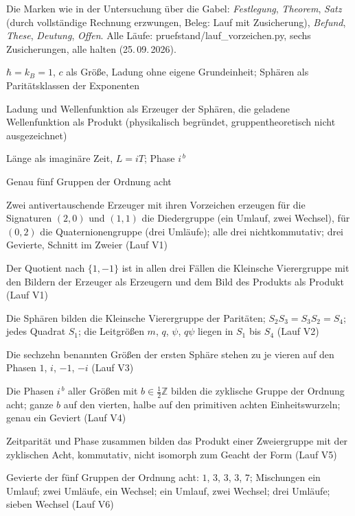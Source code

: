 \documentclass[11pt,a4paper]{article}
\begin{document}
Die Marken wie in der Untersuchung über die Gabel: \emph{Festlegung}, \emph{Theorem}, \emph{Satz} (durch vollständige Rechnung erzwungen, Beleg: Lauf mit Zusicherung), \emph{Befund}, \emph{These}, \emph{Deutung}, \emph{Offen}. Alle Läufe: pruefstand/lauf\_vorzeichen.py, sechs Zusicherungen, alle halten (25.\,09.\,2026).

\begin{description}[itemsep=1pt,font=\normalfont\bfseries]
\item[Festlegung:] $\hbar=k_B=1$, $c$ als Größe, Ladung ohne eigene Grundeinheit; Sphären als Paritätsklassen der Exponenten
\item[Festlegung:] Ladung und Wellenfunktion als Erzeuger der Sphären, die geladene Wellenfunktion als Produkt (physikalisch begründet, gruppentheoretisch nicht ausgezeichnet)
\item[Festlegung:] Länge als imaginäre Zeit, $L=iT$; Phase $i^{\,b}$
\item[Theorem:] Genau fünf Gruppen der Ordnung acht
\item[Satz:] Zwei antivertauschende Erzeuger mit ihren Vorzeichen erzeugen für die Signaturen $(2,0)$ und $(1,1)$ die Diedergruppe (ein Umlauf, zwei Wechsel), für $(0,2)$ die Quaternionengruppe (drei Umläufe); alle drei nichtkommutativ; drei Gevierte, Schnitt im Zweier (Lauf V1)
\item[Satz:] Der Quotient nach $\{1,-1\}$ ist in allen drei Fällen die Kleinsche Vierergruppe mit den Bildern der Erzeuger als Erzeugern und dem Bild des Produkts als Produkt (Lauf V1)
\item[Satz:] Die Sphären bilden die Kleinsche Vierergruppe der Paritäten; $S_2S_3=S_3S_2=S_4$; jedes Quadrat $S_1$; die Leitgrößen $m$, $q$, $\psi$, $q\psi$ liegen in $S_1$ bis $S_4$ (Lauf V2)
\item[Satz:] Die sechzehn benannten Größen der ersten Sphäre stehen zu je vieren auf den Phasen $1$, $i$, $-1$, $-i$ (Lauf V3)
\item[Satz:] Die Phasen $i^{\,b}$ aller Größen mit $b\in\tfrac12\mathbb Z$ bilden die zyklische Gruppe der Ordnung acht; ganze $b$ auf den vierten, halbe auf den primitiven achten Einheitswurzeln; genau ein Geviert (Lauf V4)
\item[Satz:] Zeitparität und Phase zusammen bilden das Produkt einer Zweiergruppe mit der zyklischen Acht, kommutativ, nicht isomorph zum Geacht der Form (Lauf V5)
\item[Satz:] Gevierte der fünf Gruppen der Ordnung acht: $1$, $3$, $3$, $3$, $7$; Mischungen ein Umlauf; zwei Umläufe, ein Wechsel; ein Umlauf, zwei Wechsel; drei Umläufe; sieben Wechsel (Lauf V6)

\end{description}
\end{document}
